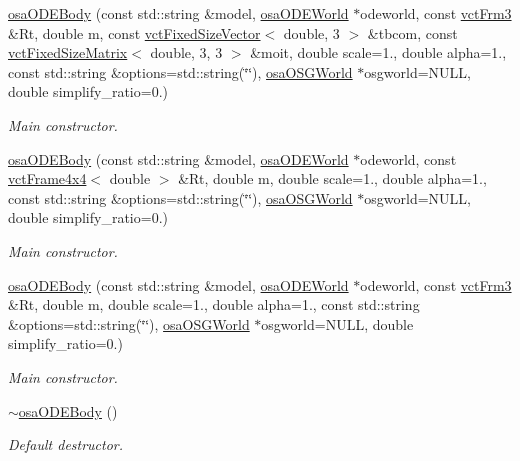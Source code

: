 \begin{DoxyCompactItemize}
\hyperlink{classosa_o_d_e_body_a4940c7dc8046e116cb6eaaba4326939c}{osa\+O\+D\+E\+Body} (const std\+::string \&model, \hyperlink{classosa_o_d_e_world}{osa\+O\+D\+E\+World} $\ast$odeworld, const \hyperlink{vct_transformation_types_8h_a81feda0a02c2d1bc26e5553f409fed20}{vct\+Frm3} \&Rt, double m, const \hyperlink{classvct_fixed_size_vector}{vct\+Fixed\+Size\+Vector}$<$ double, 3 $>$ \&tbcom, const \hyperlink{classvct_fixed_size_matrix}{vct\+Fixed\+Size\+Matrix}$<$ double, 3, 3 $>$ \&moit, double scale=1., double alpha=1., const std\+::string \&options=std\+::string(\char`\"{}\char`\"{}), \hyperlink{classosa_o_s_g_world}{osa\+O\+S\+G\+World} $\ast$osgworld=N\+U\+L\+L, double simplify\+\_\+ratio=0.)
\begin{DoxyCompactList}\small\item\em Main constructor. \end{DoxyCompactList}\item 
\hyperlink{classosa_o_d_e_body_acc663ffd208f665a6a84376cac5c1428}{osa\+O\+D\+E\+Body} (const std\+::string \&model, \hyperlink{classosa_o_d_e_world}{osa\+O\+D\+E\+World} $\ast$odeworld, const \hyperlink{classvct_frame4x4}{vct\+Frame4x4}$<$ double $>$ \&Rt, double m, double scale=1., double alpha=1., const std\+::string \&options=std\+::string(\char`\"{}\char`\"{}), \hyperlink{classosa_o_s_g_world}{osa\+O\+S\+G\+World} $\ast$osgworld=N\+U\+L\+L, double simplify\+\_\+ratio=0.)
\begin{DoxyCompactList}\small\item\em Main constructor. \end{DoxyCompactList}\item 
\hyperlink{classosa_o_d_e_body_a1c5ea3faee0f0fce9851e10c0c58cc55}{osa\+O\+D\+E\+Body} (const std\+::string \&model, \hyperlink{classosa_o_d_e_world}{osa\+O\+D\+E\+World} $\ast$odeworld, const \hyperlink{vct_transformation_types_8h_a81feda0a02c2d1bc26e5553f409fed20}{vct\+Frm3} \&Rt, double m, double scale=1., double alpha=1., const std\+::string \&options=std\+::string(\char`\"{}\char`\"{}), \hyperlink{classosa_o_s_g_world}{osa\+O\+S\+G\+World} $\ast$osgworld=N\+U\+L\+L, double simplify\+\_\+ratio=0.)
\begin{DoxyCompactList}\small\item\em Main constructor. \end{DoxyCompactList}\item 
\hyperlink{classosa_o_d_e_body_a05a97daa4ba1c3ac548b679568941930}{$\sim$osa\+O\+D\+E\+Body} ()
\begin{DoxyCompactList}\small\item\em Default destructor. \end{DoxyCompactList}\item 

\end{DoxyCompactItemize}
